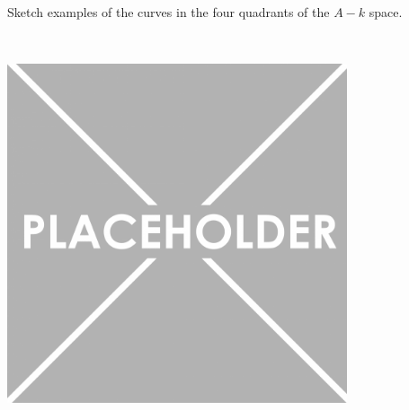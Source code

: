 Sketch examples of the curves in the four quadrants of the $A - k$ space.

\begin{solution}\ \\
\begin{center}
    \includegraphics[width=0.75\textwidth]{img/placeholder.png}
\end{center}
\end{solution}